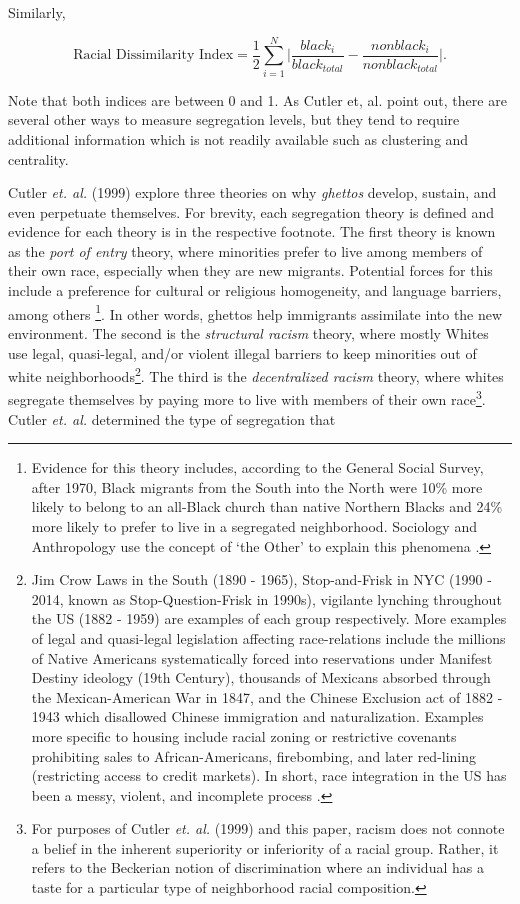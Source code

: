 {Similarly,

\begin{equation}
\label{eq:rdi}
\mbox{Racial Dissimilarity Index} = \frac{1}{2}\sum_{i=1}^N\bigg|\frac{black_i}{black_{total}}-\frac{nonblack_i }{nonblack_{total}} \bigg| .
\end{equation}

{\setlength{\parindent}{0cm}Note that both indices are between 0 and 1. As Cutler et, al. point out, there are several other ways to measure segregation levels, but they tend to require additional information which is not readily available such as clustering and centrality.
}

Cutler \textit{et. al.} (1999) explore three theories on why \textit{ghettos} develop, sustain, and even perpetuate themselves. For brevity, each segregation theory is defined and evidence for each theory is in the respective footnote. The first theory is known as the \textit{port of entry} theory, where minorities prefer to live among members of their own race, especially when they are new migrants. Potential forces for this include a preference for cultural or religious homogeneity, and language barriers, among others \footnote{Evidence for this theory includes, according to the General Social Survey, after 1970, Black migrants from the South into the North were 10\% more likely to belong to an all-Black church than native Northern Blacks and 24\% more likely to prefer to live in a segregated neighborhood. Sociology and Anthropology use the concept of `the Other' to explain this phenomena \citep{mead62}.}. In other words, ghettos help immigrants assimilate into the new environment. The second is the \textit{structural racism} theory, where mostly Whites use legal, quasi-legal, and/or violent illegal barriers to keep minorities out of white neighborhoods\footnote{Jim Crow Laws in the South (1890 - 1965), Stop-and-Frisk in NYC (1990 - 2014, known as Stop-Question-Frisk in 1990s), vigilante lynching throughout the US (1882 - 1959) are examples of each group respectively\cite{black03}. More examples of legal and quasi-legal legislation affecting race-relations include the millions of Native Americans systematically forced into reservations under Manifest Destiny ideology (19th Century), thousands of Mexicans absorbed through the Mexican-American War in 1847, and the Chinese Exclusion act of 1882 - 1943 which disallowed Chinese immigration and naturalization. Examples more specific to housing include racial zoning or restrictive covenants prohibiting sales to African-Americans, firebombing, and later red-lining (restricting access to credit markets)\cite{spear67}. In short, race integration in the US has been a messy, violent, and incomplete process \cite{black03}.}. The third is the \textit{decentralized racism} theory, where whites segregate themselves by paying more to live with members of their own race\footnote{For purposes of Cutler \textit{et. al.} (1999) and this paper, racism does not connote a belief in the inherent superiority or inferiority of a racial group. Rather, it refers to the Beckerian notion of discrimination where an individual has a taste for a particular type of neighborhood racial composition.}. Cutler \textit{et. al.} determined the type of segregation that }

